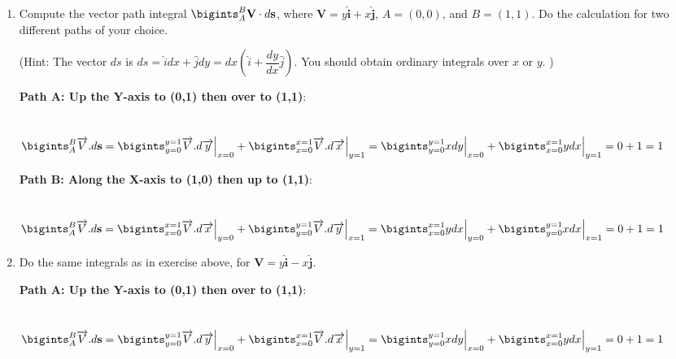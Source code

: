 \documentclass[fleqn]{article}
\begin{document}
\begin{enumerate}
\begin{enumerate}
      \end{enumerate}

    \item Compute the vector path integral $\bigints_A^B \mathbf{V}\cdot d\mathbf{s}$, where $\mathbf{V}=y \mathbf{\hat i} + x \mathbf{\hat j}$, $A=(0,0)$, and $B=(1,1)$. Do the calculation for two different paths of your choice.

    (Hint:  The vector $ds$ is $ds=\hat{i}dx+\hat{j}dy=dx(\hat{i}+\dfrac{dy}{dx} \hat{j})$.  
    You should obtain ordinary integrals over $x$ or $y$. )

      \textcolor{hwColor}{
        \textbf{Path A: Up the Y-axis to (0,1) then over to (1,1)}: \\
        \\
        \\
        $
          \bigints_{A}^{B} \overrightarrow{V}.d\mathbf{s}=\bigints_{y=0}^{y=1} \overrightarrow{V}.d\overrightarrow{y}\Big|_{x=0}+\bigints_{x=0}^{x=1} \overrightarrow{V}.d\overrightarrow{x}\Big|_{y=1} \\
          \\
          =\bigints_{y=0}^{y=1} x dy\Big|_{x=0}+\bigints_{x=0}^{x=1} y dx \Big|_{y=1}=0+1=1 \\
        $
      }

      \textcolor{hwColor}{
        \textbf{Path B: Along the X-axis to (1,0) then up to (1,1)}: \\
        \\
        \\
        $
          \bigints_{A}^{B} \overrightarrow{V}.d\mathbf{s}=\bigints_{x=0}^{x=1} \overrightarrow{V}.d\overrightarrow{x}\Big|_{y=0}+\bigints_{y=0}^{y=1} \overrightarrow{V}.d\overrightarrow{y}\Big|_{x=1} \\
          \\
          =\bigints_{x=0}^{x=1} ydx\Big|_{y=0}+\bigints_{y=0}^{y=1} xdx \Big|_{x=1}=0+1=1 \\
        $
      }

    \item Do the same integrals as in exercise above, for $\mathbf{V}=y \mathbf{\hat i} - x \mathbf{\hat j}$.
    
      \textcolor{hwColor}{
        \textbf{Path A: Up the Y-axis to (0,1) then over to (1,1)}: \\
        \\
        \\
        $
          \bigints_{A}^{B} \overrightarrow{V}.d\mathbf{s}=\bigints_{y=0}^{y=1} \overrightarrow{V}.d\overrightarrow{y}\Big|_{x=0}+\bigints_{x=0}^{x=1} \overrightarrow{V}.d\overrightarrow{x}\Big|_{y=1} \\
          \\
          =\bigints_{y=0}^{y=1} x dy\Big|_{x=0}+\bigints_{x=0}^{x=1} y dx \Big|_{y=1}=0+1=1 \\
        $
      }


\end{enumerate}
\end{document}
